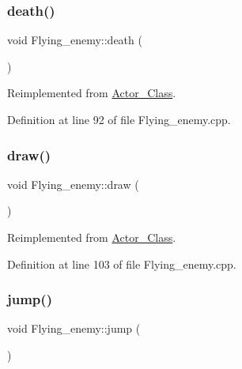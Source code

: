 \subsubsection{\texorpdfstring{death()}{death()}}
{\footnotesize\ttfamily void Flying\+\_\+enemy\+::death (\begin{DoxyParamCaption}{ }\end{DoxyParamCaption})\hspace{0.3cm}{\ttfamily [virtual]}}



Reimplemented from \hyperlink{class_actor___class_a9447c6154a674d7e6bdf24ff2874b7a8}{Actor\+\_\+\+Class}.



Definition at line 92 of file Flying\+\_\+enemy.\+cpp.

\hypertarget{class_flying__enemy_a2d8bc9f4c82ec045da7346bd3613bfcb}{}\label{class_flying__enemy_a2d8bc9f4c82ec045da7346bd3613bfcb} 
\subsubsection{\texorpdfstring{draw()}{draw()}}
{\footnotesize\ttfamily void Flying\+\_\+enemy\+::draw (\begin{DoxyParamCaption}{ }\end{DoxyParamCaption})\hspace{0.3cm}{\ttfamily [virtual]}}



Reimplemented from \hyperlink{class_actor___class_ac49cd62be76b4b950ecbe155413f1b64}{Actor\+\_\+\+Class}.



Definition at line 103 of file Flying\+\_\+enemy.\+cpp.

\hypertarget{class_flying__enemy_af9f8bc6cf140ee0c4ce1f7e340ef79e5}{}\label{class_flying__enemy_af9f8bc6cf140ee0c4ce1f7e340ef79e5} 
\subsubsection{\texorpdfstring{jump()}{jump()}}
{\footnotesize\ttfamily void Flying\+\_\+enemy\+::jump (\begin{DoxyParamCaption}{ }\end{DoxyParamCaption})\hspace{0.3cm}{\ttfamily [virtual]}}



